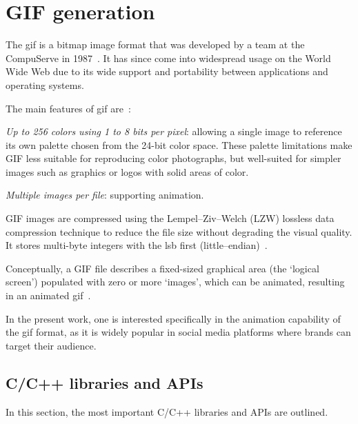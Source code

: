 %
\section{GIF generation}
\label{sec:gif-generation}
The \acrfull{gif} is a bitmap image format that was developed by a team at the
CompuServe in 1987~\cite{gifSpec87}. It has since come into widespread usage on the World Wide Web due to its wide support and portability between applications and operating systems.

The main features of \gls{gif} are~\cite{miano1999compressed}:
\begin{enum-c}
\item \emph{Up to 256 colors using 1 to 8 bits per pixel}: allowing a single image to
  reference its own palette chosen from the 24-bit color space. These palette
  limitations make GIF less suitable for reproducing color photographs, but
  well-suited for simpler images such as graphics or logos with solid areas of
  color.
\item \emph{Multiple images per file}: supporting animation.
\end{enum-c}

GIF images are compressed using the Lempel–Ziv–Welch (LZW) lossless data
compression technique to reduce the file size without degrading the visual
quality. It stores multi-byte integers with the \gls{lsb} first
(little--endian)~\cite{miano1999compressed}.

Conceptually, a GIF file describes a fixed-sized graphical area (the `logical
screen') populated with zero or more `images', which can be animated, resulting
in an animated \gls{gif}~\cite{gifSpec87}.

In the present work, one is interested specifically in the animation capability
of the \gls{gif} format, as it is widely popular in social media platforms where
brands can target their audience.

\subsection{C/C++ libraries and APIs}
\label{sec:c++-libraries-apis-1}
In this section, the most important C/C++ libraries and APIs are outlined.

